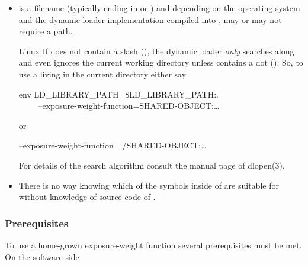 \begin{itemize}
         {environment variable, }%
\item
   is a filename (typically ending in  or )
  and depending on the operating system and the dynamic-loader implementation compiled into
  \App{},  may or may not require a path.

  \begin{restrictedmaterial}{Linux}
    If  does not contain a slash (\sample{/}), the dynamic loader
    \emph{only} searches along  and even ignores the current working
    directory unless  contains a dot ().  So, to use a
     living in the current directory either say
    \begin{literal}
      env LD\_LIBRARY\_PATH=\$LD\_LIBRARY\_PATH:. \bslash \\
      ~~~~\app{} --exposure-weight-function=\feasiblebreak SHARED-OBJECT:\dots
    \end{literal}
    or
    \begin{literal}
      \app{} --exposure-weight-function=\feasiblebreak ./SHARED-OBJECT:\dots
    \end{literal}

    For details of the search algorithm consult the manual page of dlopen(3).
  \end{restrictedmaterial}

\item
  There is no way knowing which of the symbols inside of  are suitable
  for  without knowledge of source code of .
\end{itemize}


\subsubsection[Prerequisites]{\label{sec:prerequisites}%
  Prerequisites}

To use a home-grown exposure-weight function several prerequisites must be met.  On the software
side

